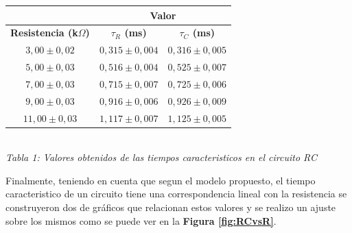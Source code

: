 \documentclass[11pt,a4paper]{article}
\begin{document}
\begin{center}
\begin{tabular}{||c|c|c||}
\hline
& \multicolumn{2}{c||}{\textbf{Valor}} \\ \hline
\textbf{Resistencia (k$\Omega$)} & \textbf{$\tau_{R}$ (ms)} & \textbf{$\tau_{C}$ (ms)} \\ \hline 
$3,00\pm0,02$ & $0,315 \pm 0,004$ & $0,316 \pm 0,005$ \\ \hline 
$5,00\pm0,03$ & $0,516\pm 0,004$ & $0,525 \pm 0,007$ \\ \hline 
$7,00\pm0,03$ & $0,715\pm 0,007$ & $0,725\pm 0,006$ \\ \hline 
$9,00\pm0,03$ & $0,916 \pm 0,006$ & $0,926 \pm 0,009$ \\ \hline 
$11,00\pm0,03$ & $1,117\pm 0,007$ & $1,125\pm 0,005$ \\ \hline 
\end{tabular}\\[0.3cm]
 
\textit{Tabla 1: Valores obtenidos de las tiempos caracteristicos en el circuito RC}
\end{center}

Finalmente, teniendo en cuenta que segun el modelo propuesto, el tiempo caracteristico de un circuito tiene una correspondencia lineal con la resistencia se construyeron dos de gráficos que relacionan estos valores y se realizo un ajuste sobre los mismos como se puede ver en la \textbf{Figura \ref{fig:RCvsR}}.
\end{document}
